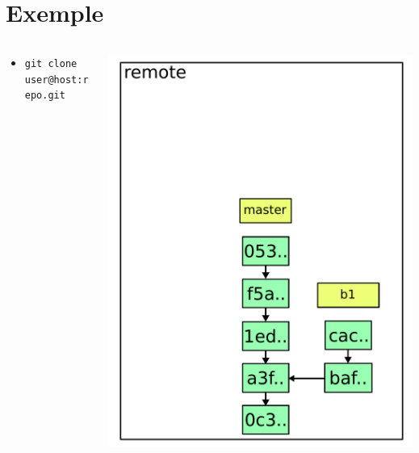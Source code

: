 \documentclass{beamer}
\begin{document}
\section{Exemple}
\begin{frame}{}
  \begin{columns}
    \begin{column}{0.60\textwidth}
      \begin{itemize}
      \item \lstinline|git clone user@host:repo.git|
      \end{itemize}
    \end{column}
    \begin{column}{0.40\textwidth}
      \includegraphics[width=\textwidth]{img/1.pdf}
    \end{column}
  \end{columns}
\end{frame}
\end{document}
